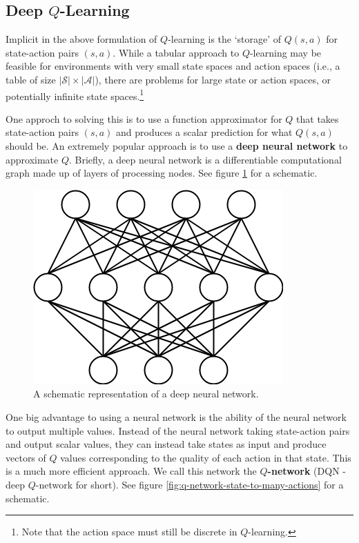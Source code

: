 \documentclass[journal, onecolumn, 12pt, draftclsnofoot]{IEEEtran}
\numberwithin{equation}{section}
\newcommand{\kword}[1]{\textbf{#1}}
\newcommand{\mc}[1]{\mathcal{#1}}
\begin{document}
		\subsection{Deep $Q$-Learning}
		\par Implicit in the above formulation of $Q$-learning is the `storage' of $Q(s,a)$ for state-action pairs $(s,a)$. While a tabular approach to $Q$-learning may be feasible for environments with very small state spaces and action spaces (i.e., a table of size $\lvert \mc{S} \rvert \times \lvert \mc{A} \rvert $), there are problems for large state or action spaces, or potentially infinite state spaces.\footnote{Note that the action space must still be discrete in $Q$-learning.}
		\par One approch to solving this is to use a function approximator for $Q$ that takes state-action pairs $(s,a)$ and produces a scalar prediction for what $Q(s,a)$ should be. An extremely popular approach is to use a \kword{deep neural network} to approximate $Q$. Briefly, a deep neural network is a differentiable computational graph made up of layers of processing nodes. See figure \ref{fig:nn-blank} for a schematic.
		\begin{figure}[ht]
			\centering
			\includegraphics[scale=0.4]{fig/nn-blank.png}
			\caption{A schematic representation of a deep neural network.}
			\label{fig:nn-blank}
		\end{figure}
		\par One big advantage to using a neural network is the ability of the neural network to output multiple values. Instead of the neural network taking state-action pairs and output scalar values, they can instead take states as input and produce vectors of $Q$ values corresponding to the quality of each action in that state. This is a much more efficient approach. We call this network the \kword{$Q$-network} (DQN - deep $Q$-network for short). See figure \ref{fig:q-network-state-to-many-actions} for a schematic.
\end{document}
